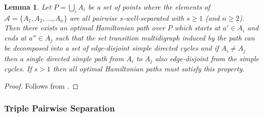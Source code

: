 \documentclass{article}
\newtheorem{lem}[thm]{Lemma}
\theoremstyle{definition}
\newcommand{\ACollection}{\mathcal{A}}
\begin{document}
\begin{lem}\label{lem:set_transition_multidigraph_decomposition}
    Let $P = \bigcup_i A_i$ be a set of points where the elements of $\ACollection = \{A_1, A_2, \ldots, A_n\}$ are all pairwise $s$-well-separated with $s \geq 1$ (and $n \geq 2$).
    Then there exists an optimal Hamiltonian path over $P$ which starts at $a' \in A_i$ and ends at $a'' \in A_j$ such that the set transition multidigraph  induced by the path can be decomposed into a set of edge-disjoint simple directed cycles and if $A_i \neq A_j$ then a single directed simple path from $A_i$ to $A_j$ also edge-disjoint from the simple cycles.
    If $s > 1$ then all optimal Hamiltonian paths must satisfy this property.
\end{lem}
\begin{proof}
    Follows from .
\end{proof}

\subsubsection{Triple Pairwise Separation}
\end{document}
